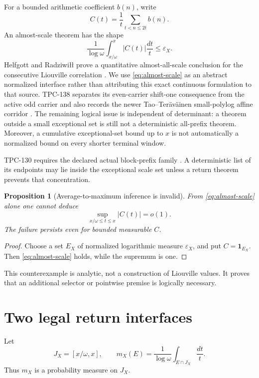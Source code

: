 \documentclass[11pt]{article}
\newtheorem{proposition}[theorem]{Proposition}
\theoremstyle{definition}
\theoremstyle{remark}
\newcommand{\one}{\mathbf 1}
\begin{document}
For a bounded arithmetic coefficient \(b(n)\), write
\[
 C(t)=\frac1t\sum_{t<n\le2t}b(n).
\]
An almost-scale theorem has the shape
\begin{equation}
 \frac1{\log\omega}
 \int_{x/\omega}^{x}|C(t)|\frac{dt}{t}
 \le\varepsilon_X.
\label{eq:almost-scale}
\end{equation}
Helfgott and Radziwi{\l}{\l} prove a quantitative almost-all-scale
conclusion for the consecutive Liouville correlation
\citep{HelfgottRadziwill2021}.  We use \eqref{eq:almost-scale} as an
abstract normalized interface rather than attributing this exact
continuous formulation to that source.  TPC-138 separates its
even-carrier shift-one consequence from the active odd carrier and
also records the newer Tao--Ter\"av\"ainen small-polylog affine
corridor \citep{WangTPC138,TaoTeravainen2026}.  The remaining
logical issue is independent of determinant: a theorem outside a
small exceptional set is still not a deterministic all-prefix
theorem.  Moreover, a cumulative exceptional-set bound up to \(x\)
is not automatically a normalized bound on every shorter terminal
window.

TPC-130 requires the declared actual block-prefix family
\citep{WangTPC130}.  A deterministic list of its endpoints may lie
inside the exceptional scale set unless a return theorem prevents
that concentration.

\begin{proposition}[Average-to-maximum inference is invalid]
\label{prop:no-max}
From \eqref{eq:almost-scale} alone one cannot deduce
\[
 \sup_{x/\omega\le t\le x}|C(t)|=o(1).
\]
The failure persists even for bounded measurable \(C\).
\end{proposition}

\begin{proof}
Choose a set \(E_X\) of normalized logarithmic measure
\(\varepsilon_X\), and put \(C=\one_{E_X}\).  Then
\eqref{eq:almost-scale} holds, while the supremum is one.
\end{proof}

This counterexample is analytic, not a construction of Liouville
values.  It proves that an additional selector or pointwise premise
is logically necessary.

\section{Two legal return interfaces}

Let
\[
 J_X=[x/\omega,x],\qquad
 m_X(E)=\frac1{\log\omega}\int_{E\cap J_X}\frac{dt}{t}.
\]
Thus \(m_X\) is a probability measure on \(J_X\).
\end{document}
